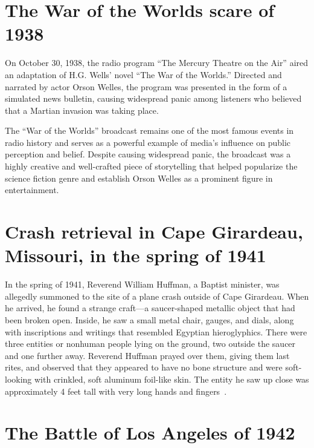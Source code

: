 \section{The War of the Worlds scare of 1938}
\label{2023-UFO-part-History-chapter-pre-1945-WW1938}

On October 30, 1938, the radio program ``The Mercury Theatre on the Air'' aired an adaptation of H.G. Wells' novel ``The War of the Worlds.'' Directed and narrated by actor Orson Welles, the program was presented in the form of a simulated news bulletin, causing widespread panic among listeners who believed that a Martian invasion was taking place.

The ``War of the Worlds'' broadcast remains one of the most famous events in radio history and serves as a powerful example of media's influence on public perception and belief. Despite causing widespread panic, the broadcast was a highly creative and well-crafted piece of storytelling that helped popularize the science fiction genre and establish Orson Welles as a prominent figure in entertainment.


\section{Crash retrieval in Cape Girardeau, Missouri, in the spring of 1941}
\label{2023-UFO-part-History-chapter-pre-1945-CGM}


In the spring of 1941, Reverend William Huffman, a Baptist minister, was allegedly summoned to the site of a plane crash outside of Cape Girardeau.
When he arrived, he found a strange craft---a saucer-shaped metallic object that had been broken open.
Inside, he saw a small metal chair, gauges, and dials, along with inscriptions and writings that resembled Egyptian hieroglyphics.
There were three entities or nonhuman people lying on the ground, two outside the saucer and one further away.
Reverend Huffman prayed over them, giving them last rites,
and observed that they appeared to have no bone structure and were soft-looking with crinkled, soft aluminum foil-like skin.
The entity he saw up close was approximately 4 feet tall with very long hands and fingers~\cite[pp.~34--43]{Wood2005Jan}.


\section{The Battle of Los Angeles of 1942}
\label{2023-UFO-part-History-chapter-pre-1945-boLA1942}


